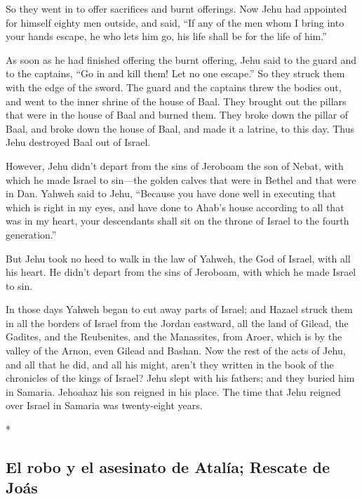 \begin{paracol}{2}
\begin{otherlanguage}{english}
 So they went in to offer sacrifices and burnt offerings.
Now Jehu had appointed for himself eighty men outside, and said, ``If
any of the men whom I bring into your hands escape, he who lets him go,
his life shall be for the life of him.''

 As soon as he had finished offering the burnt offering,
Jehu said to the guard and to the captains, ``Go in and kill them! Let
no one escape.'' So they struck them with the edge of the sword. The
guard and the captains threw the bodies out, and went to the inner
shrine of the house of Baal.  They brought out the
pillars that were in the house of Baal and burned them. 
They broke down the pillar of Baal, and broke down the house of Baal,
and made it a latrine, to this day.  Thus Jehu destroyed
Baal out of Israel.

 However, Jehu didn't depart from the sins of Jeroboam
the son of Nebat, with which he made Israel to sin---the golden calves
that were in Bethel and that were in Dan.  Yahweh said to
Jehu, ``Because you have done well in executing that which is right in
my eyes, and have done to Ahab's house according to all that was in my
heart, your descendants shall sit on the throne of Israel to the fourth
generation.''

 But Jehu took no heed to walk in the law of Yahweh, the
God of Israel, with all his heart. He didn't depart from the sins of
Jeroboam, with which he made Israel to sin.

 In those days Yahweh began to cut away parts of Israel;
and Hazael struck them in all the borders of Israel  from
the Jordan eastward, all the land of Gilead, the Gadites, and the
Reubenites, and the Manassites, from Aroer, which is by the valley of
the Arnon, even Gilead and Bashan.  Now the rest of the
acts of Jehu, and all that he did, and all his might, aren't they
written in the book of the chronicles of the kings of Israel?
 Jehu slept with his fathers; and they buried him in
Samaria. Jehoahaz his son reigned in his place.  The time
that Jehu reigned over Israel in Samaria was twenty-eight years.

\end{otherlanguage}

\switchcolumn[0]*

\hypertarget{el-robo-y-el-asesinato-de-ataluxeda-rescate-de-jouxe1s}{%
\subsection{El robo y el asesinato de Atalía; Rescate de
Joás}\label{el-robo-y-el-asesinato-de-ataluxeda-rescate-de-jouxe1s}}


\end{paracol}
